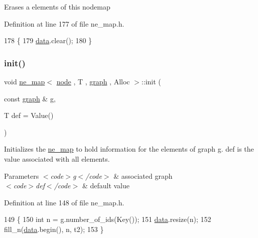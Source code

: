 Erases a elements of this nodemap 

Definition at line 177 of file ne\+\_\+map.\+h.


\begin{DoxyCode}
178 \{
179     \mbox{\hyperlink{classne__map_af73307678e05a9c24c084d98b267afa8}{data}}.clear();
180 \}
\end{DoxyCode}
\mbox{\label{classne__map_a4ef2ab4aebcb57a7a101975bf6a88e24}} 
\subsubsection{\texorpdfstring{init()}{init()}}
{\footnotesize\ttfamily void \mbox{\hyperlink{classne__map}{ne\+\_\+map}}$<$ \mbox{\hyperlink{classnode}{node}} , T , \mbox{\hyperlink{classgraph}{graph}} , Alloc $>$\+::init (\begin{DoxyParamCaption}\item[{const \mbox{\hyperlink{classgraph}{graph}}  \&}]{g,  }\item[{T}]{def = {\ttfamily Value()} }\end{DoxyParamCaption})\hspace{0.3cm}{\ttfamily [inherited]}}

Initializes the \mbox{\hyperlink{classne__map}{ne\+\_\+map}} to hold information for the elements of graph g. def is the value associated with all elements.


\begin{DoxyParams}{Parameters}
{\em $<$code$>$g$<$/code$>$} & associated {\ttfamily graph} \\
\hline
{\em $<$code$>$def$<$/code$>$} & default value \\
\hline
\end{DoxyParams}


Definition at line 148 of file ne\+\_\+map.\+h.


\begin{DoxyCode}
149 \{
150     \textcolor{keywordtype}{int} n = \mbox{\hyperlink{rings_8cpp_aa9df5aa3976a89a96a5f1c7611d42938}{g}}.number\_of\_ids(Key());
151     \mbox{\hyperlink{classne__map_af73307678e05a9c24c084d98b267afa8}{data}}.resize(n);
152     fill\_n(\mbox{\hyperlink{classne__map_af73307678e05a9c24c084d98b267afa8}{data}}.begin(), n, t2);
153 \}
\end{DoxyCode}
\mbox{\label{classne__map_a4bcfa7ec2dcbfaa42fab93dfa81e8ab0}} 
